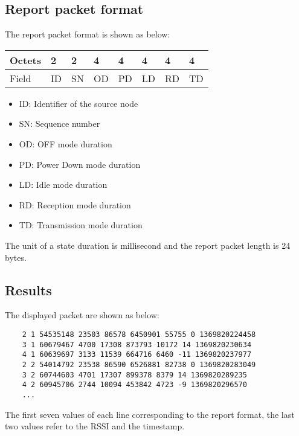\documentclass[a4paper,11pt]{article}
\begin{document}
  \subsection{Report packet format}

The report packet format is shown as below:

  \begin{table}[h] \footnotesize
  \begin{tabularx}{\textwidth}{|X||X|X|X|X|X|X|X|}
    \hline
    Octets & 2 & 2 & 4 & 4 & 4 & 4 & 4 \\
    \hline
    Field & ID & SN & OD & PD & LD & RD & TD \\
    \hline
  \end{tabularx}
  \end{table}

  \begin{itemize}
    \item ID: Identifier of the source node
    \item SN: Sequence number
    \item OD: OFF mode duration
    \item PD: Power Down mode duration
    \item LD: Idle mode duration
    \item RD: Reception mode duration
    \item TD: Transmission mode duration
  \end{itemize}


The unit of a state duration is millisecond and the report packet length is 24 bytes.

  \subsection{Results}

The displayed packet are shown as below:

  \begin{verbatim}
    2 1 54535148 23503 86578 6450901 55755 0 1369820224458
    3 1 60679467 4700 17308 873793 10172 14 1369820230634
    4 1 60639697 3133 11539 664716 6460 -11 1369820237977
    2 2 54014792 23538 86590 6526881 82738 0 1369820283049
    3 2 60744603 4701 17307 899378 8379 14 1369820289235
    4 2 60945706 2744 10094 453842 4723 -9 1369820296570
    ...
  \end{verbatim}

The first seven values of each line corresponding to the report format, the last two values refer to the RSSI and the timestamp.
\end{document}
